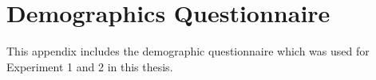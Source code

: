 \chapter{Demographics Questionnaire}\label{app:demographicsQuestionnaire}
This appendix includes the demographic questionnaire which was used for Experiment 1 and 2 in this thesis. 

